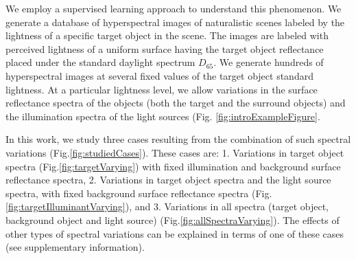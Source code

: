 \documentclass{jov}
\begin{document}

We employ a supervised learning approach to understand this phenomenon. We generate a database of hyperspectral images of naturalistic scenes labeled by the lightness of a specific target object in the scene. The images are labeled with perceived lightness of a uniform surface having the target object reflectance placed under the standard daylight spectrum $D_{65}$. We generate hundreds of hyperspectral images at several fixed values of the target object standard lightness. At a particular lightness level, we allow variations in the surface reflectance spectra of the objects (both the target and the surround objects) and the illumination spectra of the light sources (Fig. \ref{fig:introExampleFigure}. 

In this work, we study three cases resulting from the combination of such spectral variations (Fig.\ref{fig:studiedCases}). These cases are: 1. Variations in target object spectra (Fig.\ref{fig:targetVarying}) with fixed illumination and background surface reflectance spectra, 2. Variations in target object spectra and the light source spectra, with fixed background surface reflectance spectra (Fig.\ref{fig:targetIlluminantVarying}), and 3. Variations in all spectra (target object, background object and light source) (Fig.\ref{fig:allSpectraVarying}). The effects of other types of spectral variations can be explained in terms of one of these cases (see supplementary information).
\end{document}
